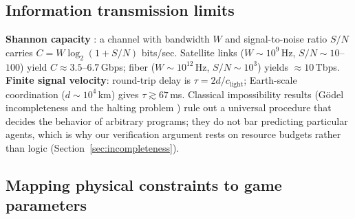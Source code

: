 \documentclass[manuscript,screen,review]{jair}
\begin{document}
\subsection{Information transmission limits}
\textbf{Shannon capacity} \cite{shannon.1948,cover.thomas.2006}: a channel with bandwidth $W$ and signal-to-noise ratio $S/N$ carries $C = W\log_2(1+S/N)$ bits/sec. Satellite links ($W \sim 10^9$\,Hz, $S/N \sim 10$--$100$) yield $C \approx 3.5$--$6.7$\,Gbps; fiber ($W\sim 10^{12}$\,Hz, $S/N \sim 10^3$) yields ${\approx}10$\,Tbps. \textbf{Finite signal velocity}: round-trip delay is $\tau = 2d/c_{\mathrm{light}}$; Earth-scale coordination ($d \sim 10^4$\,km) gives $\tau \gtrsim 67$\,ms. Classical impossibility results (G\"odel incompleteness and the halting problem \cite{godel.1931,turing.1936}) rule out a universal procedure that decides the behavior of arbitrary programs; they do not bar predicting particular agents, which is why our verification argument rests on resource budgets rather than logic (Section~\ref{sec:incompleteness}).

\subsection{Mapping physical constraints to game parameters}
\label{app:mapping}
\end{document}
